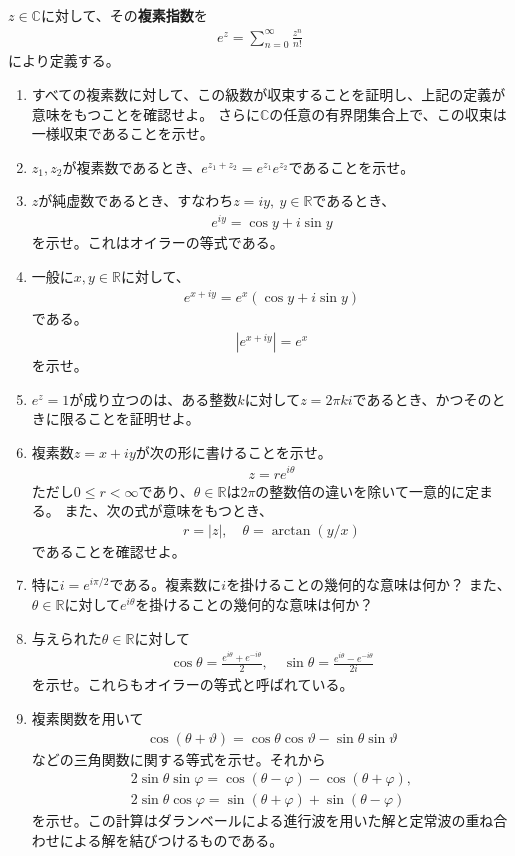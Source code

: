 \begin{renshu}
  $z\in\mathbb{C}$に対して、その\textbf{複素指数}を
\begin{align}
e^{z}=\sum_{n=0}^{\infty}\frac{z^{n}}{n!}
\end{align}
により定義する。
\begin{enumerate}
\item すべての複素数に対して、この級数が収束することを証明し、上記の定義が意味をもつことを確認せよ。
さらに$\mathbb{C}$の任意の有界閉集合上で、この収束は一様収束であることを示せ。
\item $z_{1},z_{2}$が複素数であるとき、$e^{z_{1}+z_{2}}=e^{z_{1}}e^{z_{2}}$であることを示せ。
\item $z$が純虚数であるとき、すなわち$z=iy,\ y\in\mathbb{R}$であるとき、
\begin{align}
e^{iy}=\cos y+i\sin y
\end{align}
を示せ。これはオイラーの等式である。
\item 一般に$x,y\in\mathbb{R}$に対して、
\begin{align}
    e^{x+iy}=e^{x}(\cos y+i\sin y)
\end{align}
である。
\begin{align}
|e^{x+iy}|=e^{x}
\end{align}
を示せ。
\item $e^{z}=1$が成り立つのは、ある整数$k$に対して$z=2\pi ki$であるとき、かつそのときに限ることを証明せよ。
\item 複素数$z=x+iy$が次の形に書けることを示せ。
\begin{align}
z=re^{i\theta}
\end{align}
ただし$0\leq r<\infty$であり、$\theta\in\mathbb{R}$は$2\pi$の整数倍の違いを除いて一意的に定まる。
また、次の式が意味をもつとき、
\begin{align}
r=|z|,\quad\theta=\arctan(y/x)
\end{align}
であることを確認せよ。
\item 特に$i=e^{i\pi/2}$である。複素数に$i$を掛けることの幾何的な意味は何か？
また、$\theta\in\mathbb{R}$に対して$e^{i\theta}$を掛けることの幾何的な意味は何か？
\item 与えられた$\theta\in\mathbb{R}$に対して
\begin{align}
\cos\theta=\frac{e^{i\theta}+e^{-i\theta}}{2},\quad\sin\theta=\frac{e^{i\theta}-e^{-i\theta}}{2i}
\end{align}
を示せ。これらもオイラーの等式と呼ばれている。
\item 複素関数を用いて
\begin{align}
\cos(\theta+\vartheta)=\cos\theta\cos\vartheta-\sin\theta\sin\vartheta
\end{align}
などの三角関数に関する等式を示せ。それから
\begin{align}
2\sin\theta\sin\varphi=\cos(\theta-\varphi)-\cos(\theta+\varphi),\\
2\sin\theta\cos\varphi=\sin(\theta+\varphi)+\sin(\theta-\varphi)
\end{align}
を示せ。この計算はダランベールによる進行波を用いた解と定常波の重ね合わせによる解を結びつけるものである。
\end{enumerate}
\end{renshu}


